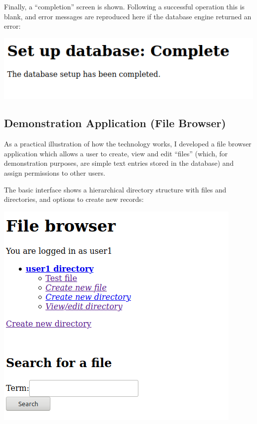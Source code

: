 \documentclass[12pt]{report}
\begin{document}
Finally, a ``completion'' screen is shown. Following a successful operation this is blank, and error messages are reproduced here if the database engine returned an error:

\begin{center}
  \includegraphics[scale=0.5]{04-setup3.png}
\end{center}

\subsection{Demonstration Application (File Browser)}
As a practical illustration of how the technology works, I developed a file browser application which allows a user to create, view and edit ``files'' (which, for demonstration purposes, are simple text entries stored in the database) and assign permissions to other users.

The basic interface shows a hierarchical directory structure with files and directories, and options to create new records:

\begin{center}
  \includegraphics[scale=0.5]{05-browser1.png}
\end{center}
\end{document}
